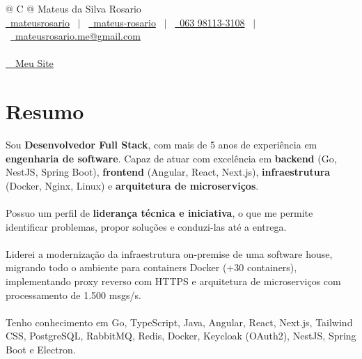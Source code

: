 \documentclass[a4paper,12pt]{article}
\begin{document}
\pagestyle{empty} 



\begin{tabularx}{\linewidth}{@{} C @{}}
\Huge{Mateus da Silva Rosario} \\[7.5pt]
\href{https://github.com/mateusrosario}{\raisebox{-0.05\height}\faGithub\ mateusrosario} \ $|$ \ 
\href{https://linkedin.com/in/mateus-rosario}{\raisebox{-0.05\height}\faLinkedin\ mateus-rosario} \ $|$ \ 
\href{tel:+55063981133108}{\raisebox{-0.05\height}\faMobile \ 063 98113-3108} \ $|$ \
\href{mailto:mateusrosario.me@gmail.com}{\raisebox{-0.05\height}\faEnvelope \ mateusrosario.me@gmail.com} \\
\\
\href{https://dev.mrosario.com.br/}{\raisebox{-0.05\height} \ \faGlobe \ Meu Site}
\end{tabularx}

\section{Resumo}
Sou \textbf{Desenvolvedor Full Stack}, com mais de 5 anos
de experiência em \textbf{engenharia de software}. Capaz de
atuar com excelência em \textbf{backend} (Go, NestJS, Spring
Boot), \textbf{frontend} (Angular, React, Next.js),
\textbf{infraestrutura} (Docker, Nginx, Linux) e
\textbf{arquitetura de microserviços}.\\\\
Possuo um perfil de \textbf{liderança técnica e iniciativa},
o que me permite identificar problemas, propor soluções e
conduzi-las até a entrega.\\\\
Liderei a modernização da
infraestrutura on-premise de uma software house, migrando
todo o ambiente para containers Docker (+30 containers),
implementando proxy reverso com HTTPS e arquitetura de
microserviços com processamento de 1.500 msgs/s.\\\\
Tenho conhecimento em Go, TypeScript, Java, Angular, React,
Next.js, Tailwind CSS, PostgreSQL, RabbitMQ, Redis, Docker,
Keycloak (OAuth2), NestJS, Spring Boot e Electron.
\end{document}

